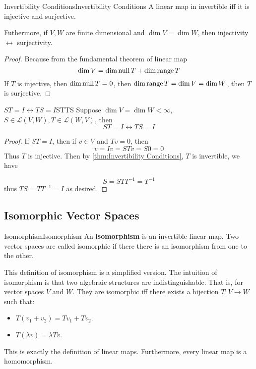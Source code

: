\documentclass[../main.tex]{subfiles}
\begin{document}
\begin{theorem}{Invertibility Conditions}{Invertibility Conditions}
A linear map in invertible iff it is injective and surjective.

Futhermore, if $V,W$ are finite dimensional and $\dim V=\dim W$, then injectivity $\leftrightarrow $ surjectivity.
\end{theorem}

\begin{proof}
Because from the fundamental theorem of linear map
\begin{equation*}
\dim V=  \dim \operatorname{null} T + \dim \operatorname{range} T
\end{equation*}
If $T$ is injective, then $\dim \operatorname{null} T=0$, then $\dim \operatorname{range} T = \dim V=\dim W$, then $T$ is surjective.
\end{proof}

\begin{theorem}{$ST=I \leftrightarrow TS=I$}{STTS}
Suppose $\dim V=\dim W<\infty $, $S\in \mathscr{L}(V,W), T\in \mathscr{L}(W,V)$, then
\begin{equation*}
ST=I \leftrightarrow TS=I
\end{equation*}
\end{theorem}


\begin{proof}
If $ST=I$, then if $v\in V$ and $Tv=0$, then 
\begin{equation*}
v=Iv=STv=S 0=0
\end{equation*}
Thus $T$ is injective. Then by \ref{thm:Invertibility Conditions}, $T$ is invertible, we have

\begin{equation*}
S = STT^{-1} = T^{-1}
\end{equation*}
thus $TS=TT^{-1}=I$ as desired.
\end{proof}


\subsection{Isomorphic Vector Spaces}

\begin{definition}{Isomorphism}{Isomorphism}
An \textbf{isomorphism} is an invertible linear map. Two vector spaces are called isomorphic if there there is an isomorphism from one to the other.
\end{definition}
\begin{remark}
This definition of isomorphism is a simplified version. The intuition of isomorphism is that two algebraic structures are indistinguishable. That is, for vector spaces $V$ and $W$. They are isomorphic iff there exists a bijection $T:V \rightarrow W$ such that:
\begin{itemize}
\item $T(v_1+v_2)=Tv_1+Tv_2$.
\item $T(\lambda v) = \lambda Tv$.
\end{itemize}

This is exactly the definition of linear maps. Furthermore, every linear map is a homomorphism.
\end{remark}
\end{document}
